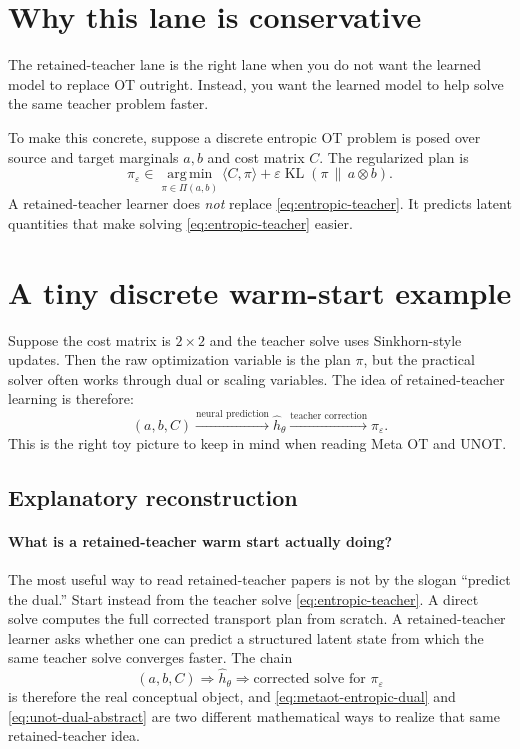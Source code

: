 \documentclass[11pt]{report}
\newcommand{\KL}{\operatorname{KL}}
\newcommand{\argmin}{\operatorname*{arg\,min}}
\begin{document}
\section{Why this lane is conservative}

The retained-teacher lane is the right lane when you do not want the learned model
to replace OT outright.  Instead, you want the learned model to help solve the same
teacher problem faster.

To make this concrete, suppose a discrete entropic OT problem is posed over source
and target marginals $a,b$ and cost matrix $C$.  The regularized plan is
\begin{equation}
\pi_\varepsilon
\in
\argmin_{\pi\in\Pi(a,b)}
\langle C,\pi\rangle + \varepsilon \KL(\pi\,\|\,a\otimes b).
\label{eq:entropic-teacher}
\end{equation}
A retained-teacher learner does \emph{not} replace \eqref{eq:entropic-teacher}.
It predicts latent quantities that make solving \eqref{eq:entropic-teacher} easier.

\section{A tiny discrete warm-start example}

Suppose the cost matrix is $2\times 2$ and the teacher solve uses Sinkhorn-style
updates.  Then the raw optimization variable is the plan $\pi$, but the practical
solver often works through dual or scaling variables.  The idea of retained-teacher
learning is therefore:
\begin{equation}
(a,b,C)
\xrightarrow{\text{neural prediction}}
\widehat h_\theta
\xrightarrow{\text{teacher correction}}
\pi_\varepsilon.
\label{eq:warm-start-tiny-example}
\end{equation}
This is the right toy picture to keep in mind when reading Meta OT and UNOT.

\subsection*{Explanatory reconstruction}

\paragraph{What is a retained-teacher warm start actually doing?}
The most useful way to read retained-teacher papers is not by the slogan
``predict the dual.''  Start instead from the teacher solve
\eqref{eq:entropic-teacher}.  A direct solve computes the full corrected transport
plan from scratch.  A retained-teacher learner asks whether one can predict a
structured latent state from which the same teacher solve converges faster.  The
chain
\begin{equation}
(a,b,C)
\Longrightarrow
\widehat h_\theta
\Longrightarrow
\text{corrected solve for }\pi_\varepsilon
\label{eq:retained-teacher-chain}
\end{equation}
is therefore the real conceptual object, and \eqref{eq:metaot-entropic-dual} and
\eqref{eq:unot-dual-abstract} are two different mathematical ways to realize that
same retained-teacher idea.
\end{document}
